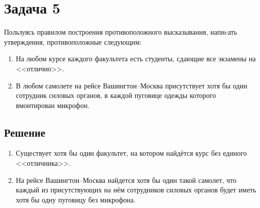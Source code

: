 \section*{Задача 5}

Пользуясь правилом построения противоположного высказывания,
напиcать утверждения, противоположные следующим:

\begin{enumerate}
  \item На любом курсе каждого факультета есть студенты,
  сдающие все экзамены на <<отлично>>.
  \item В любом самолете на рейсе Вашингтон--Москва
  присутствует хотя бы один сотрудник силовых органов,
  в каждой пуговице одежды которого вмонтирован микрофон.
\end{enumerate}

\subsection*{Решение}

\begin{enumerate}
  \item Существует хотя бы один факультет,
  на котором найдётся курс без единого <<отличника>>.
  \item На рейсе Вашингтон--Москва найдется хотя бы один такой самолет, что
  каждый из присутствующих на нём сотрудников силовых органов
  будет иметь хотя бы одну пуговицу без микрофона.
\end{enumerate}

